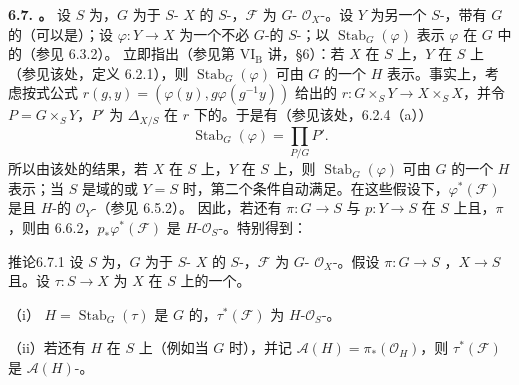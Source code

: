 \textbf{6.7. 。} 设 $S$ 为，$G$ 为于 $S$- $X$ 的 $S$-，$\mathcal F$ 为 $G$- $\mathcal O_X$-。设 $Y$ 为另一个 $S$-，带有 $G$ 的（可以是）；设 $\varphi:Y\to X$ 为一个不必 $G$-的 $S$-；以 $\operatorname{Stab}_G(\varphi)$ 表示 $\varphi$ 在 $G$ 中的（参见 6.3.2）。
立即指出（参见第 $\mathrm{VI_B}$ 讲，§6）：若 $X$ 在 $S$ 上，$Y$ 在 $S$ 上（参见该处，定义 6.2.1），则 $\operatorname{Stab}_G(\varphi)$ 可由 $G$ 的一个 $H$ 表示。事实上，考虑按式公式 $r(g,y)=(\varphi(y),g\varphi(g^{-1}y))$ 给出的 $r:G\times_S Y\to X\times_S X$，并令 $P=G\times_S Y$，$P'$ 为 $\Delta_{X/S}$ 在 $r$ 下的。于是有（参见该处，6.2.4（a））
\[
\operatorname{Stab}_G(\varphi)=\prod_{P/G}P'.
\]
所以由该处的结果，若 $X$ 在 $S$ 上，$Y$ 在 $S$ 上，则 $\operatorname{Stab}_G(\varphi)$ 可由 $G$ 的一个 $H$ 表示；当 $S$ 是域的或 $Y=S$ 时，第二个条件自动满足。在这些假设下，$\varphi^*(\mathcal F)$ 是且 $H$-的 $\mathcal O_Y$-（参见 6.5.2）。
因此，若还有 $\pi:G\to S$ 与 $p:Y\to S$ 在 $S$ 上且，$\pi$ ，则由 6.6.2，$p_*\varphi^*(\mathcal F)$ 是 $H$-$\mathcal O_S$-。特别得到：
\begin{SGAresult}{推论}{6.7.1}
设 $S$ 为，$G$ 为于 $S$- $X$ 的 $S$-，$\mathcal F$ 为 $G$- $\mathcal O_X$-。假设 $\pi:G\to S$ ，$X\to S$ 且。设 $\tau:S\to X$ 为 $X$ 在 $S$ 上的一个。

（i） $H=\operatorname{Stab}_G(\tau)$ 是 $G$ 的，$\tau^*(\mathcal F)$ 为 $H$-$\mathcal O_S$-。

（ii）若还有 $H$ 在 $S$ 上（例如当 $G$ 时），并记 $\mathcal A(H)=\pi_*(\mathcal O_H)$，则 $\tau^*(\mathcal F)$ 是 $\mathcal A(H)$-。
\end{SGAresult}

